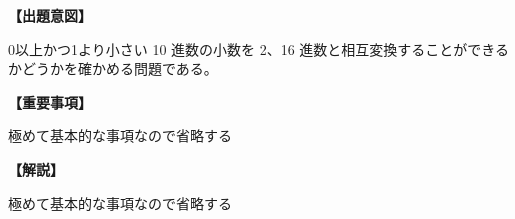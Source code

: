 \noindent \textbf{【出題意図】}

\noindent 0以上かつ1より小さい 10 進数の小数を 2、16 進数と相互変換することができるかどうかを確かめる問題である。

\vspace{1em}
\noindent \textbf{【重要事項】}

\noindent 極めて基本的な事項なので省略する

\vspace{1em}
\noindent \textbf{【解説】}

\noindent 極めて基本的な事項なので省略する

